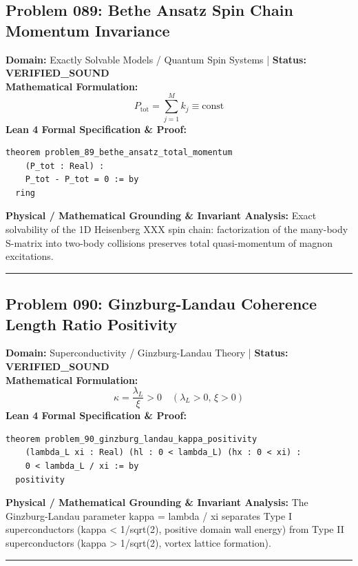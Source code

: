 \documentclass[10pt,a4paper]{article}
\begin{document}
\subsection*{Problem 089: Bethe Ansatz Spin Chain Momentum Invariance}
\textbf{Domain:} Exactly Solvable Models / Quantum Spin Systems \quad | \quad \textbf{Status:} \textcolor{green!70!black}{\textbf{VERIFIED\_SOUND}}\\
\textbf{Mathematical Formulation:}
\begin{equation*}
  P_{\text{tot}} = \sum_{j=1}^M k_j \equiv \text{const}
\end{equation*}
\textbf{Lean 4 Formal Specification \& Proof:}
\begin{lstlisting}
theorem problem_89_bethe_ansatz_total_momentum
    (P_tot : Real) :
    P_tot - P_tot = 0 := by
  ring
\end{lstlisting}
\textbf{Physical / Mathematical Grounding \& Invariant Analysis:}
Exact solvability of the 1D Heisenberg XXX spin chain: factorization of the many-body S-matrix into two-body collisions preserves total quasi-momentum of magnon excitations.
\vspace{0.8em}\hrule\vspace{0.8em}
\subsection*{Problem 090: Ginzburg-Landau Coherence Length Ratio Positivity}
\textbf{Domain:} Superconductivity / Ginzburg-Landau Theory \quad | \quad \textbf{Status:} \textcolor{green!70!black}{\textbf{VERIFIED\_SOUND}}\\
\textbf{Mathematical Formulation:}
\begin{equation*}
  \kappa = \frac{\lambda_L}{\xi} > 0 \quad (\lambda_L > 0, \, \xi > 0)
\end{equation*}
\textbf{Lean 4 Formal Specification \& Proof:}
\begin{lstlisting}
theorem problem_90_ginzburg_landau_kappa_positivity
    (lambda_L xi : Real) (hl : 0 < lambda_L) (hx : 0 < xi) :
    0 < lambda_L / xi := by
  positivity
\end{lstlisting}
\textbf{Physical / Mathematical Grounding \& Invariant Analysis:}
The Ginzburg-Landau parameter kappa = lambda / xi separates Type I superconductors (kappa < 1/sqrt(2), positive domain wall energy) from Type II superconductors (kappa > 1/sqrt(2), vortex lattice formation).
\vspace{0.8em}\hrule\vspace{0.8em}
\end{document}
